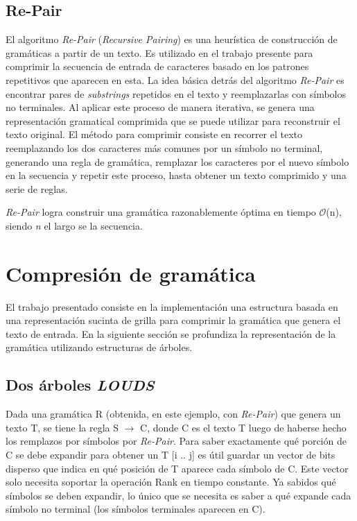 \subsection{Re-Pair}

El algoritmo \textit{Re-Pair}\cite{Larsson2000} (\textit{Recursive Pairing}) es una heurística de construcción de gramáticas a partir de un texto. Es utilizado en el trabajo presente para comprimir la secuencia de entrada de caracteres basado en los patrones repetitivos que aparecen en esta. La idea básica detrás del algoritmo \textit{Re-Pair} es encontrar pares de \textit{substrings} repetidos en el texto y reemplazarlas con símbolos no terminales. Al aplicar este proceso de manera iterativa, se genera una representación gramatical comprimida que se puede utilizar para reconstruir el texto original. El método para comprimir consiste en recorrer el texto reemplazando los dos caracteres más comunes por un símbolo no terminal, generando una regla de gramática, remplazar los caracteres por el nuevo símbolo en la secuencia y repetir este proceso, hasta obtener un texto comprimido y una serie de reglas.

\textit{Re-Pair} logra construir una gramática razonablemente óptima en tiempo $\mathcal{O}$(n), siendo \textit{n} el largo se la secuencia.

\section{Compresión de gramática}

El trabajo presentado consiste en la implementación una estructura basada en una representación sucinta de grilla para comprimir la gramática que genera el texto de entrada. En la siguiente sección se profundiza la representación de la gramática utilizando estructuras de árboles.

\subsection{Dos árboles \textit{LOUDS}}

Dada una gramática R (obtenida, en este ejemplo, con \textit{Re-Pair}) que genera un texto T, se tiene la regla S $\rightarrow$ C, donde C es el texto T luego de haberse hecho los remplazos por símbolos por \textit{Re-Pair}. Para saber exactamente qué porción de C se debe expandir para obtener un T [i .. j] es útil guardar un vector de bits disperso que indica en qué posición de T aparece cada símbolo de C. Este vector solo necesita soportar la operación Rank en tiempo constante. Ya sabidos qué símbolos se deben expandir, lo único que se necesita es saber a qué expande cada símbolo no terminal (los símbolos terminales aparecen en C).

